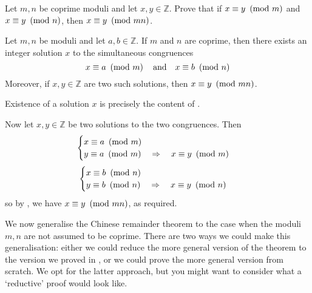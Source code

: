 \begin{exercise}
\label{exCRTUniqueness}
Let $m,n$ be coprime moduli and let $x,y \in \mathbb{Z}$. Prove that if $x \equiv y ~\left(\text{mod}~m\right)$ and $x \equiv y ~\left(\text{mod}~n\right)$, then $x \equiv y ~\left(\text{mod}~mn\right)$.
\end{exercise}

\begin{theorem}
\label{thmChineseRemainder}
Let $m,n$ be moduli and let $a,b \in \mathbb{Z}$. If $m$ and $n$ are coprime, then there exists an integer solution $x$ to the simultaneous congruences
\[ x \equiv a ~\left(\text{mod}~m\right) \quad \text{and} \quad x \equiv b ~\left(\text{mod}~n\right) \]
Moreover, if $x,y \in \mathbb{Z}$ are two such solutions, then $x \equiv y ~\left(\text{mod}~mn\right)$.
\end{theorem}
\begin{cproof}
Existence of a solution $x$ is precisely the content of .

Now let $x,y \in \mathbb{Z}$ be two solutions to the two congruences. Then
\[ \begin{cases} x \equiv a ~\left(\text{mod}~m\right) \\ y \equiv a ~\left(\text{mod}~m\right) \quad \Rightarrow \quad x \equiv y ~\left(\text{mod}~m\right) \end{cases} \]
\[ \begin{cases} x \equiv b ~\left(\text{mod}~n\right) \\ y \equiv b ~\left(\text{mod}~n\right) \quad \Rightarrow \quad x \equiv y ~\left(\text{mod}~n\right) \end{cases} \]
so by , we have $x \equiv y ~\left(\text{mod}~mn\right)$, as required.
\end{cproof}

We now generalise the Chinese remainder theorem to the case when the moduli $m,n$ are not assumed to be coprime. There are two ways we could make this generalisation: either we could reduce the more general version of the theorem to the version we proved in , or we could prove the more general version from scratch. We opt for the latter approach, but you might want to consider what a `reductive' proof would look like.

